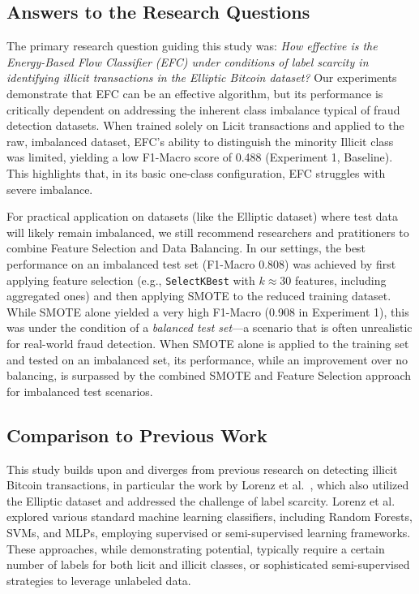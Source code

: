\documentclass[12pt]{article}
\begin{document}
\subsection{Answers to the Research Questions}\label{sec:answers}

The primary research question guiding this study was: \emph{How effective is the Energy-Based Flow Classifier (EFC) under
conditions of label scarcity in identifying illicit transactions in the Elliptic Bitcoin dataset?} Our experiments demonstrate
that EFC can be an effective algorithm, but its performance is critically dependent on addressing the inherent class imbalance
typical of fraud detection datasets. When trained solely on Licit transactions and applied to the raw, imbalanced dataset,
EFC's ability to distinguish the minority Illicit class was limited, yielding a low F1-Macro score of 0.488 (Experiment 1, Baseline).
This highlights that, in its basic one-class configuration, EFC struggles with severe imbalance.

For practical application on datasets (like the Elliptic dataset) where test data will likely remain imbalanced, we still
recommend researchers and pratitioners to combine Feature Selection and Data Balancing. In our settings, the best performance
on an imbalanced test set (F1-Macro 0.808) was achieved by first applying feature selection (e.g., \texttt{SelectKBest}
with $k \approx 30$ features, including aggregated ones) and then applying SMOTE to the reduced training dataset. While
SMOTE alone yielded a very high F1-Macro (0.908 in Experiment 1), this was under the condition of a
\textit{balanced test set}---a scenario that is often unrealistic for real-world fraud detection. When SMOTE alone is
applied to the training set and tested on an imbalanced set, its performance, while an improvement over no balancing, is
surpassed by the combined SMOTE and Feature Selection approach for imbalanced test scenarios.


\subsection{Comparison to Previous Work}\label{sec:comparision}
This study builds upon and diverges from previous research on detecting illicit Bitcoin transactions, in particular the
work by Lorenz et al.~\cite{lorenz2021machinelearningmethodsdetect}, which also utilized the Elliptic dataset and addressed
the challenge of label scarcity. Lorenz et al.~\cite{lorenz2021machinelearningmethodsdetect} explored various standard
machine learning classifiers, including Random Forests, SVMs, and MLPs, employing supervised or semi-supervised learning
frameworks. These approaches, while demonstrating potential, typically require a certain number of labels for both licit
and illicit classes, or sophisticated semi-supervised strategies to leverage unlabeled data.
\end{document}
